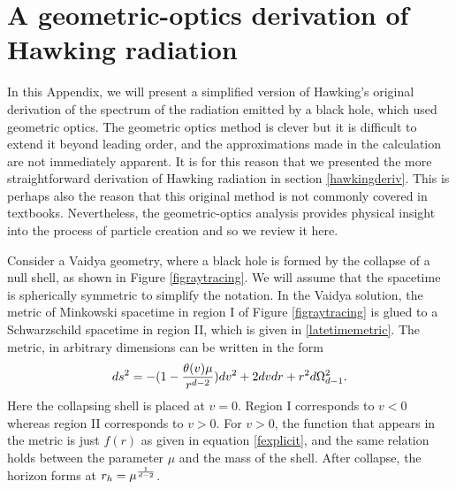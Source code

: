 \documentclass[12pt]{article}
\newcommand{\be}{\begin{equation}}
\newcommand{\ee}{\end{equation}}
\begin{document}
\appendix
\section{A geometric-optics derivation of Hawking radiation \label{secraytracehawk}}
In this Appendix, we will present a simplified version of  Hawking's original derivation \cite{Hawking:1974sw} of the spectrum of the radiation emitted by a black hole, which used geometric optics. The geometric optics method is clever but it is difficult to  extend it beyond leading
order, and the approximations made in the calculation are not immediately apparent. It is for this reason that we presented the more straightforward derivation of Hawking radiation in section \ref{hawkingderiv}. This is perhaps
also the reason that this original method is not commonly covered in textbooks. Nevertheless, the geometric-optics analysis provides physical insight into the process of particle creation and so we review it here.
 

Consider a Vaidya geometry, where a black hole is formed by the  collapse of a null shell, as shown in Figure \ref{figraytracing}. We will assume that the spacetime is spherically symmetric to simplify the notation. In the Vaidya
solution, the metric of Minkowski spacetime in region I of Figure \ref{figraytracing} is glued to a Schwarzschild spacetime in region II, which is given in \eqref{latetimemetric}. The metric, in arbitrary dimensions can be written in the form \cite{Iyer:1989nd} 
\be
ds^2 = -(1 - {\theta(v) \mu \over r^{d-2}}) d v^2 + 2 d v d r + r^2 d \Omega_{d-1}^2.
\ee
Here the collapsing shell is placed at $v = 0$.  Region I corresponds to $v < 0$ whereas region II corresponds to $v > 0$. For $v > 0$, the function that appears in the metric is just $f(r)$ as given in equation \eqref{fexplicit}, and the same relation holds between the parameter $\mu$ and the mass of the shell. After collapse, the horizon forms at $r_h = \mu^{1 \over d-2}$.
\end{document}
